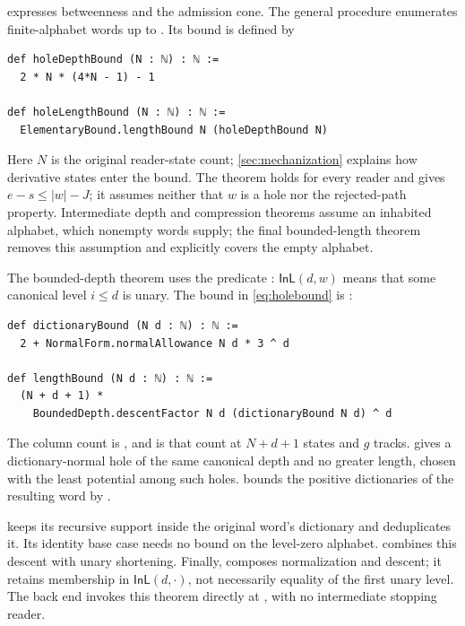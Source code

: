  expresses betweenness and the
admission cone. The general procedure
 enumerates finite-alphabet words up to
. Its bound is defined by
\begin{lstlisting}
def holeDepthBound (N : ℕ) : ℕ :=
  2 * N * (4*N - 1) - 1

def holeLengthBound (N : ℕ) : ℕ :=
  ElementaryBound.lengthBound N (holeDepthBound N)
\end{lstlisting}
Here $N$ is the original reader-state count; \cref{sec:mechanization}
explains how derivative states enter the bound. The theorem
 holds for every reader and gives
$e-s\le |w|-J$; it assumes neither that $w$ is a hole nor the rejected-path property. Intermediate depth and compression theorems assume an inhabited
alphabet, which nonempty words supply; the final bounded-length theorem
 removes this assumption and
explicitly covers the empty alphabet.

The bounded-depth theorem uses the predicate :
$\mathsf{InL}(d,w)$ means that some canonical level $i\le d$ is unary.
The bound in \eqref{eq:holebound} is :
\begin{lstlisting}
def dictionaryBound (N d : ℕ) : ℕ :=
  2 + NormalForm.normalAllowance N d * 3 ^ d

def lengthBound (N d : ℕ) : ℕ :=
  (N + d + 1) *
    BoundedDepth.descentFactor N d (dictionaryBound N d) ^ d
\end{lstlisting}
The column count is , and
 is that count at $N+d+1$ states
and $g$ tracks.  gives a
dictionary-normal hole of the same canonical depth and no greater length,
chosen with the least potential  among
such holes.
 bounds the
positive dictionaries of the resulting word by
.

 keeps its recursive support
inside the original word's dictionary and deduplicates it. Its identity
base case needs no bound on the level-zero alphabet.
 combines this descent
with unary shortening. Finally, 
composes normalization and descent; it retains membership in
$\mathsf{InL}(d,\cdot)$, not necessarily equality of the first unary level.
The back end invokes this theorem directly at
, with no intermediate stopping reader.

